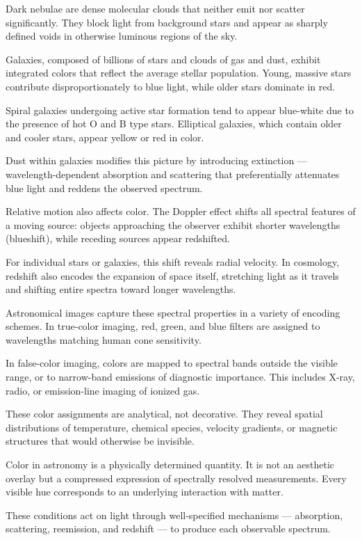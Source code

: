 Dark nebulae are dense molecular clouds that neither emit nor scatter significantly. They block light from background stars and appear as sharply defined voids in otherwise luminous regions of the sky.

Galaxies, composed of billions of stars and clouds of gas and dust, exhibit integrated colors that reflect the average stellar population. Young, massive stars contribute disproportionately to blue light, while older stars dominate in red.

Spiral galaxies undergoing active star formation tend to appear blue-white due to the presence of hot O and B type stars. Elliptical galaxies, which contain older and cooler stars, appear yellow or red in color.

Dust within galaxies modifies this picture by introducing extinction — wavelength-dependent absorption and scattering that preferentially attenuates blue light and reddens the observed spectrum.

Relative motion also affects color. The Doppler effect shifts all spectral features of a moving source: objects approaching the observer exhibit shorter wavelengths (blueshift), while receding sources appear redshifted.

For individual stars or galaxies, this shift reveals radial velocity. In cosmology, redshift also encodes the expansion of space itself, stretching light as it travels and shifting entire spectra toward longer wavelengths.

Astronomical images capture these spectral properties in a variety of encoding schemes. In true-color imaging, red, green, and blue filters are assigned to wavelengths matching human cone sensitivity.

In false-color imaging, colors are mapped to spectral bands outside the visible range, or to narrow-band emissions of diagnostic importance. This includes X-ray, radio, or emission-line imaging of ionized gas.

These color assignments are analytical, not decorative. They reveal spatial distributions of temperature, chemical species, velocity gradients, or magnetic structures that would otherwise be invisible.

Color in astronomy is a physically determined quantity. It is not an aesthetic overlay but a compressed expression of spectrally resolved measurements. Every visible hue corresponds to an underlying interaction with matter.

These conditions act on light through well-specified mechanisms — absorption, scattering, reemission, and redshift — to produce each observable spectrum.


